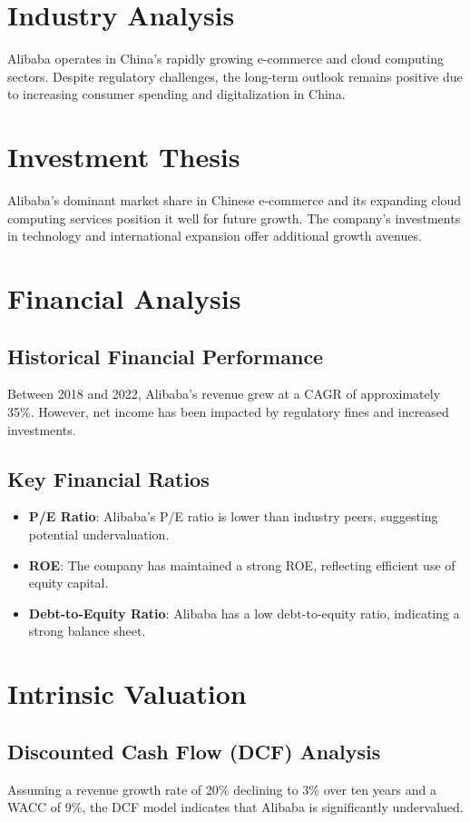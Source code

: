 \documentclass[12pt]{report}
\begin{document}
\section{Industry Analysis}
Alibaba operates in China's rapidly growing e-commerce and cloud computing sectors. Despite regulatory challenges, the long-term outlook remains positive due to increasing consumer spending and digitalization in China.

\section{Investment Thesis}
Alibaba's dominant market share in Chinese e-commerce and its expanding cloud computing services position it well for future growth. The company's investments in technology and international expansion offer additional growth avenues.

\section{Financial Analysis}
\subsection{Historical Financial Performance}
Between 2018 and 2022, Alibaba's revenue grew at a CAGR of approximately 35\%. However, net income has been impacted by regulatory fines and increased investments.

\subsection{Key Financial Ratios}
\begin{itemize}
    \item \textbf{P/E Ratio}: Alibaba's P/E ratio is lower than industry peers, suggesting potential undervaluation.
    \item \textbf{ROE}: The company has maintained a strong ROE, reflecting efficient use of equity capital.
    \item \textbf{Debt-to-Equity Ratio}: Alibaba has a low debt-to-equity ratio, indicating a strong balance sheet.
\end{itemize}

\section{Intrinsic Valuation}
\subsection{Discounted Cash Flow (DCF) Analysis}
Assuming a revenue growth rate of 20\% declining to 3\% over ten years and a WACC of 9\%, the DCF model indicates that Alibaba is significantly undervalued.
\end{document}
